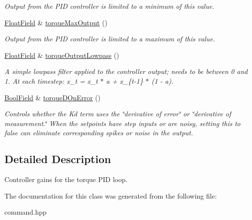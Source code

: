 \begin{DoxyCompactItemize}
\begin{DoxyCompactList}\small\item\em Output from the P\+ID controller is limited to a minimum of this value. \end{DoxyCompactList}\item 
\mbox{\label{classhebi_1_1Command_1_1Settings_1_1Actuator_1_1TorqueGains_a590d35a63babac36bad9f6ab40572952}} 
\hyperlink{classhebi_1_1Command_1_1FloatField}{Float\+Field} \& \hyperlink{classhebi_1_1Command_1_1Settings_1_1Actuator_1_1TorqueGains_a590d35a63babac36bad9f6ab40572952}{torque\+Max\+Output} ()
\begin{DoxyCompactList}\small\item\em Output from the P\+ID controller is limited to a maximum of this value. \end{DoxyCompactList}\item 
\mbox{\label{classhebi_1_1Command_1_1Settings_1_1Actuator_1_1TorqueGains_a0920834b05619085b8fbd8b6b022333b}} 
\hyperlink{classhebi_1_1Command_1_1FloatField}{Float\+Field} \& \hyperlink{classhebi_1_1Command_1_1Settings_1_1Actuator_1_1TorqueGains_a0920834b05619085b8fbd8b6b022333b}{torque\+Output\+Lowpass} ()
\begin{DoxyCompactList}\small\item\em A simple lowpass filter applied to the controller output; needs to be between 0 and 1. At each timestep\+: x\+\_\+t = x\+\_\+t $\ast$ a + x\+\_\+\{t-\/1\} $\ast$ (1 -\/ a). \end{DoxyCompactList}\item 
\mbox{\label{classhebi_1_1Command_1_1Settings_1_1Actuator_1_1TorqueGains_aeb0818f49f62f020c401a47930151b8c}} 
\hyperlink{classhebi_1_1Command_1_1BoolField}{Bool\+Field} \& \hyperlink{classhebi_1_1Command_1_1Settings_1_1Actuator_1_1TorqueGains_aeb0818f49f62f020c401a47930151b8c}{torque\+D\+On\+Error} ()
\begin{DoxyCompactList}\small\item\em Controls whether the Kd term uses the \char`\"{}derivative of error\char`\"{} or \char`\"{}derivative of measurement.\char`\"{} When the setpoints have step inputs or are noisy, setting this to {\ttfamily false} can eliminate corresponding spikes or noise in the output. \end{DoxyCompactList}\end{DoxyCompactItemize}


\subsection{Detailed Description}
Controller gains for the torque P\+ID loop. 

The documentation for this class was generated from the following file\+:\begin{DoxyCompactItemize}
\item 
command.\+hpp\end{DoxyCompactItemize}
